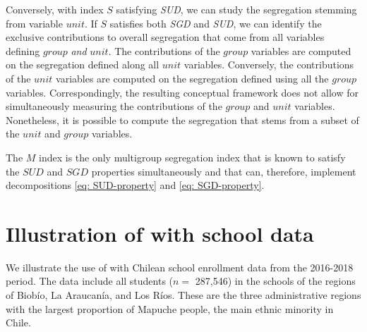 Conversely, with index $S$ satisfying \textit{SUD}, we can study the segregation stemming from variable $unit$. If $S$ satisfies both \textit{SGD} and \textit{SUD}, we can identify the exclusive contributions to overall segregation that come from all variables defining $group$ \textit{and} $unit$.
The contributions of the $group$ variables are computed on the segregation defined along all $unit$ variables. Conversely, the contributions of the $unit$ variables are computed on the segregation defined using all the $group$ variables. Correspondingly, the resulting conceptual framework does not allow for simultaneously measuring the contributions of the $group$ and $unit$ variables. Nonetheless, it is possible to compute the segregation that stems from a subset of the $unit$ and $group$ variables.

The $M$ index is the only multigroup segregation index that is known to satisfy the $SUD$ and $SGD$ properties simultaneously and that can, therefore, implement decompositions \ref{eq: SUD-property} and \ref{eq: SGD-property}.



\section{Illustration of  with school data}
We illustrate the use of  with Chilean school enrollment data from the 2016-2018 period. The data include all students ($n =$ 287,546) in the schools of the regions of Biobío, La Araucanía, and Los Ríos. These are the three administrative regions with the largest proportion of Mapuche people, the main ethnic minority in Chile.

